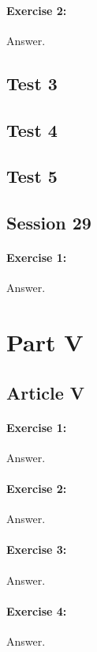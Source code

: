 \documentclass{article}
\begin{document}
\paragraph{Exercise 2:}
Answer.
\newpage

\subsection*{Test 3}
\newpage

\subsection*{Test 4}
\newpage

\subsection*{Test 5}
\newpage

\subsection*{Session 29}
\paragraph{Exercise 1:}
Answer.
\newpage

\section*{Part V}

\subsection*{Article V}
\paragraph{Exercise 1:}
Answer.
\paragraph{Exercise 2:}
Answer.
\paragraph{Exercise 3:}
Answer.
\paragraph{Exercise 4:}
Answer.
\end{document}
